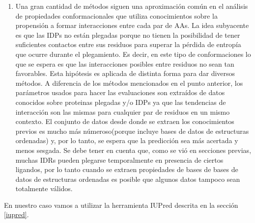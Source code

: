 \begin{enumerate}
\item Una gran cantidad de métodos siguen una aproximación común en el análisis de propiedades conformacionales que utiliza conocimientos sobre la propensión a formar interacciones entre cada par de AAs.
La idea subyacente es que las IDPs no están plegadas porque no tienen la posibilidad de tener suficientes contactos entre sus residuos para superar la pérdida de entropía que ocurre durante el plegamiento.
Es decir, en este tipo de conformaciones lo que se espera es que las interacciones posibles entre residuos no sean tan favorables.
Esta hipótesis es aplicada de distinta forma para dar diversos métodos.
A diferencia de los métodos mencionados en el punto anterior, los parámetros usados para hacer las evaluaciones son extraídos de datos conocidos sobre proteinas plegadas y/o IDPs ya que las 
tendencias de interacción son las mismas para cualquier par de residuos en un mismo contexto.
El conjunto de datos desde donde se extraen los conocimientos previos es mucho más númeroso(porque incluye bases de datos de estructuras ordenadas) y, por lo tanto, se espera que la predicción sea más acertada y menos sesgada.
Se debe tener en cuenta que, como se vió en secciones previas, muchas IDRs pueden plegarse temporalmente en presencia de ciertos ligandos, por lo tanto cuando se extraen propiedades de bases de bases de datos de estructuras ordenadas 
es posible que algunos datos tampoco sean totalmente válidos.   
\end{enumerate}




En nuestro caso vamos a utilizar la herramienta IUPred descrita en la sección \ref{iupred}.



